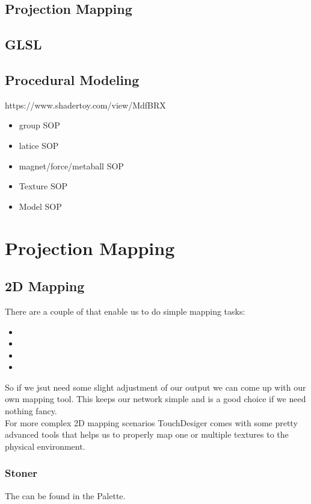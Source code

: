 \subsection*{Projection Mapping} %
\subsection*{GLSL}
\subsection*{Procedural Modeling} %
https://www.shadertoy.com/view/MdfBRX

\label{sub:procedural_modeling}

\begin{itemize}
	\item group SOP
	\item latice SOP
	\item magnet/force/metaball SOP
	\item Texture SOP
	\item Model SOP
\end{itemize}

\section{Projection Mapping}

\subsection{2D Mapping}
There are a couple of \TOPs that enable us to do simple mapping tasks:
\begin{itemize}
	\item {}
	\item {}
	\item {}
	\item {}
\end{itemize}
So if we jsut need some slight adjustment of our output we can come up with our own mapping tool. This keeps our network simple and is a good choice if we need nothing fancy.\\
For more complex 2D mapping scenarios TouchDesiger comes with some pretty advanced tools that helps us to properly map one or multiple textures to the physical environment.

\subsubsection{Stoner}
The  \COMP can be found in the Palette.

